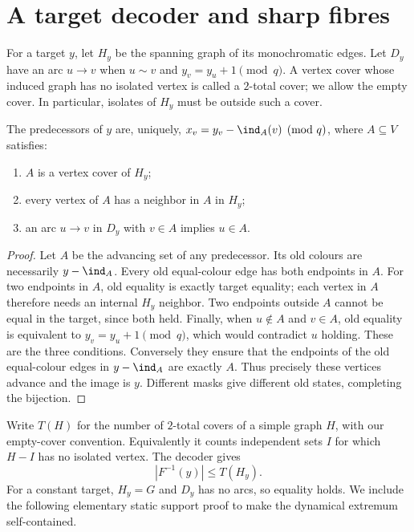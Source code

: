 \section{A target decoder and sharp fibres}\label{sec:inverse}
For a target $y$, let $H_y$ be the spanning graph of its monochromatic
edges. Let $D_y$ have an arc $u\to v$ when $u\sim v$ and
$y_v=y_u+1\pmod q$. A vertex cover whose induced graph has no isolated
vertex is called a $2$-total cover; we allow the empty cover. In particular,
isolates of $H_y$ must be outside such a cover.

\begin{theorem}\label{thm:decoder}
The predecessors of $y$ are, uniquely,
$x_v=y_v-\ind_A(v)\pmod q$, where $A\subseteq V$ satisfies:
\begin{enumerate}
\item $A$ is a vertex cover of $H_y$;
\item every vertex of $A$ has a neighbor in $A$ in $H_y$;
\item an arc $u\to v$ in $D_y$ with $v\in A$ implies $u\in A$.
\end{enumerate}
\end{theorem}
\begin{proof}
Let $A$ be the advancing set of any predecessor. Its old colours are
necessarily $y-\ind_A$. Every old equal-colour edge has both endpoints in
$A$. For two endpoints in $A$, old equality is exactly target equality;
each vertex in $A$ therefore needs an internal $H_y$ neighbor. Two endpoints
outside $A$ cannot be equal in the target, since both held. Finally, when
$u\notin A$ and $v\in A$, old equality is equivalent to
$y_v=y_u+1\pmod q$, which would contradict $u$ holding. These are the
three conditions. Conversely they ensure that the endpoints of the old
equal-colour edges in $y-\ind_A$ are exactly $A$. Thus precisely these
vertices advance and the image is $y$. Different masks give different old
states, completing the bijection.
\end{proof}

Write $T(H)$ for the number of $2$-total covers of a simple graph $H$,
with our empty-cover convention. Equivalently it counts independent sets
$I$ for which $H-I$ has no isolated vertex. The decoder gives
\begin{equation}\label{eq:static-bound}
 |F^{-1}(y)|\le T(H_y).
\end{equation}
For a constant target, $H_y=G$ and $D_y$ has no arcs, so equality holds.
We include the following elementary static support proof to make the
dynamical extremum self-contained.

